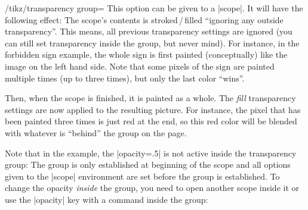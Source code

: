 \begin{key}{/tikz/transparency group=}
    This option can be given to a |scope|. It will have the following effect:
    The scope's contents is stroked\,/\,filled ``ignoring any outside
    transparency''. This means, all previous transparency settings are ignored
    (you can still set transparency inside the group, but never mind). For
    instance, in the forbidden sign example, the whole sign is first painted
    (conceptually) like the image on the left hand side. Note that some pixels
    of the sign are painted multiple times (up to three times), but only the
    last color ``wins''.

    Then, when the scope is finished, it is painted as a whole. The \emph{fill}
    transparency settings are now applied to the resulting picture. For
    instance, the pixel that has been painted three times is just red at the
    end, so this red color will be blended with whatever is ``behind'' the
    group on the page.
\begin{codeexample}[preamble={\usetikzlibrary{patterns,shapes.symbols}}]
\end{codeexample}

    Note that in the example, the |opacity=.5| is not active inside the
    transparency group: The group is only established at beginning of the scope
    and all options given to the |{scope}| environment are set before the group
    is established. To change the opacity \emph{inside} the group, you need to
    open another scope inside it or use the |opacity| key with a command inside
    the group:
\begin{codeexample}[preamble={\usetikzlibrary{patterns,shapes.symbols}}]
\end{codeexample}
\end{key}
